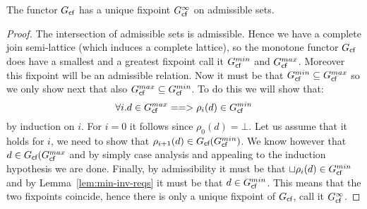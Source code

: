 \documentclass[preprint,nocopyrightspace]{sigplanconf}
\begin{document}
\begin{lemma} The functor $G_{\textsf{cf}}$ has a unique fixpoint $G_{\textsf{cf}}^\infty$ on admissible sets. \end{lemma}
\begin{proof} 
The intersection of admissible sets is admissible. Hence we have a complete join semi-lattice (which induces a 
complete lattice), so the monotone functor $G_{\textsf{cf}}$ does have a smallest and a greatest fixpoint call
it $G_{\textsf{cf}}^{min}$ and $G_{\textsf{cf}}^{max}$. Moreover this fixpoint will be an admissible relation. Now it must be 
that $G_{\textsf{cf}}^{min} \subseteq G_{\textsf{cf}}^{max}$ so we only show next that
also $G_{\textsf{cf}}^{max} \subseteq G_{\textsf{cf}}^{min}$. To do this we will show that:
\[ \forall i. d \in G_{\textsf{cf}}^{max} ==> \rho_i(d) \in G_{\textsf{cf}}^{min} \] 
by induction on $i$. For $i = 0$ it follows since $\rho_0(d) = \bot$. Let us assume 
that it holds for $i$, we need to show that $\rho_{i+1}(d) \in G_{\textsf{cf}}(G_{\textsf{cf}}^{min})$.
We know however that $d \in G_{\textsf{cf}}(G_{\textsf{cf}}^{max}$ and by simply case analysis and appealing
to the induction hypothesis we are done. Finally, by admissibility it must be that
$\sqcup\rho_i(d) \in G_{\textsf{cf}}^{min}$ and by Lemma~\ref{lem:min-inv-reqs} it
must be that $d \in G_{\textsf{cf}}^{min}$. This means that the two fixpoints coincide, 
hence there is only a unique fixpoint of $G_{\textsf{cf}}$, call it $G_{\textsf{cf}}^\infty$.
\end{proof} 
\end{document}
